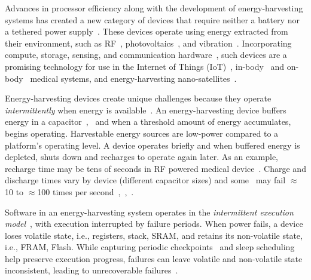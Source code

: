 Advances in processor efficiency along with the development of energy-harvesting systems has created a new category of devices that require neither a battery nor a tethered power supply~\cite{prasad_comst_2014,lucia_snapl_2017,soyata_csm_2016}. These devices operate using energy extracted from their environment, such as RF~\cite{rf_powered_computing_gollakota_2014}, photovoltaics~\cite{margolies_infocom_2016,margolies_tosn_2016}, and vibration~\cite{gorlatova_sigmetrics_2014}. Incorporating compute, storage, sensing, and communication hardware~\cite{wisp5,moo}, such devices are a promising technology for use in the Internet of Things (IoT)~\cite{ku_cst_2016}, in-body~\cite{nadeau_naturebio_2017} and on-body~\cite{bandodkar_electroanalysis_2015} medical systems, and energy-harvesting nano-satellites~\cite{kicksat}.

Energy-harvesting devices create unique challenges because they operate {\em intermittently} when energy is available~\cite{hicks_isca_2017,lucia_snapl_2017}. An
energy-harvesting device buffers energy in a capacitor~\cite{gorlatova_tmc_2013},~\cite{gunduz_commag_2014} and when a threshold amount of energy accumulates, begins operating. Harvestable energy sources are low-power compared to a platform's operating level. A device operates briefly and when buffered energy is depleted, shuts down and recharges to operate again later. As an example, recharge time may be tens of seconds in RF powered medical device~\cite[Fig. 3c]{nadeau_naturebio_2017}. Charge and discharge times vary by device (different capacitor sizes) and some~\cite{wisp} may fail $\approx$10 to $\approx$100 times per second~\cite{tan_infocom_2016},~\cite{mementos},~\cite{nvp}.

Software in an energy-harvesting system operates in the {\em intermittent execution model}~\cite{dino,lucia_snapl_2017}, with execution interrupted by failure periods. When power fails, a device loses volatile state, i.e., registers, stack, SRAM, and retains its non-volatile state, i.e., FRAM, Flash. While capturing periodic checkpoints~\cite{mementos,quickrecall} and sleep scheduling~\cite{dewdrop,hibernus,hibernusplusplus} help preserve execution progress, failures can leave volatile and non-volatile state inconsistent, leading to unrecoverable failures~\cite{dino,edb}. 

